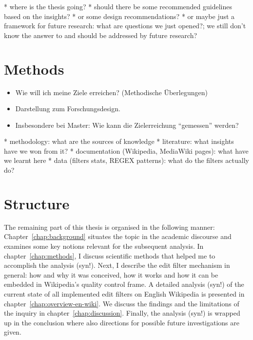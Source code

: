 \begin{comment}
* Think about: what's the computer science take on the field? How can we design a "better"/more efficient/more user friendly system? A system that reflects particular values (vgl Code 2.0, Chapter 3, p.34)?
  * GT is good for tackling controversial questions: e.g. are filters with disallow action a too severe interference with the editing process that has way too much negative consequences? (e.g. driving away new comers?)

* framing question: why does filter legacy system still exist in times of fancier machine learning tools?
\end{comment}


* where is the thesis going?
  * should there be some recommended guidelines based on the insights?
  * or some design recommendations?
  * or maybe just a framework for future research: what are questions we just opened?; we still don't know the answer to and should be addressed by future research?


\section{Methods}
\begin{itemize}
	\item Wie will ich meine Ziele erreichen? (Methodische Überlegungen)
	\item Darstellung zum Forschungsdesign.
	\item Insbesondere bei Master: Wie kann die Zielerreichung ``gemessen'' werden?
\end{itemize}

* methodology: what are the sources of knowledge
  * literature: what insights have we won from it?
  * documentation (Wikipedia, MediaWiki pages): what have we learnt here
  * data (filters stats, REGEX patterns): what do the filters actually do?

\section{Structure}

The remaining part of this thesis is organised in the following manner:
Chapter~\ref{chap:background} situates the topic in the academic discourse and examines some key notions relevant for the subsequent analysis.
In chapter~\ref{chap:methods}, I discuss scientific methods that helped me to accomplish the analysis (syn!).
Next, I describe the edit filter mechanism in general: how and why it was conceived, how it works and how it can be embedded in Wikipedia's quality control frame.
A detailed analysis (syn!) of the current state of all implemented edit filters on English Wikipedia is presented in chapter~\ref{chap:overview-en-wiki}.
We discuss the findings and the limitations of the inquiry in chapter~\ref{chap:discussion}.
Finally, the analysis (syn!) is wrapped up in the conclusion where also directions for possible future investigations are given.


